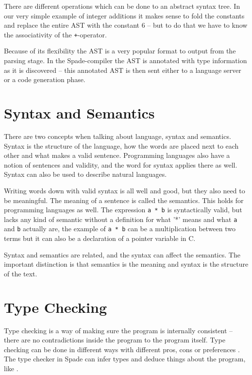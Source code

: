 There are different operations which can be done to an abstract syntax tree. In our very simple example of integer additions it makes sense to fold the constants and replace the entire AST with the constant 6 -- but to do that we have to know the associativity of the \verb!+!-operator.

Because of its flexibility the AST is a very popular format to output from the parsing stage. In the Spade-compiler the AST is annotated with type information as it is discovered -- this annotated AST is then sent either to a language server or a code generation phase.

\section{Syntax and Semantics}
There are two concepts when talking about language, syntax and semantics. Syntax is the structure of the language, how the words are placed next to each other and what makes a valid sentence. Programming languages also have a notion of sentences and validity, and the word for syntax applies there as well. Syntax can also be used to describe natural languages.

Writing words down with valid syntax is all well and good, but they also need to be meaningful. The meaning of a sentence is called the semantics. This holds for programming languages as well. The expression \verb+a * b+ is syntactically valid, but lacks any kind of semantic without a definition for what '*' means and what \verb+a+ and \verb+b+ actually are, the example of \verb+a * b+ can be a multiplication between two terms but it can also be a declaration of a pointer variable in C.

Syntax and semantics are related, and the syntax can affect the semantics. The important distinction is that semantics is the meaning and syntax is the structure of the text.

\section{Type Checking} %
\label{sec:TypeChecking}
Type checking is a way of making sure the program is internally consistent -- there are no contradictions inside the program to the program itself. Type checking can be done in different ways with different pros, cons or preferences \cite{src:TypeCheckersBook}. The type checker in Spade can infer types and deduce things about the program, like  \cite{src:spadeAnHDL}.

